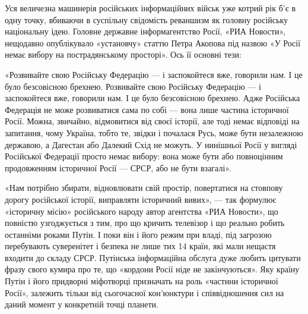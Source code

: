 Уся величезна машинерія російських інформаційних військ уже котрий рік б’є в
одну точку, вбиваючи в суспільну свідомість реваншизм як головну російську
національну ідею. Головне державне інформагентство Росії, «РИА Новости»,
нещодавно опублікувало «установчу» статтю Петра Акопова під назвою «У Росії
немає вибору на пострадянському просторі».  Ось її основні тези:

«Розвивайте свою Російську Федерацію --- і заспокойтеся вже, говорили нам.  І це
було безсовісною брехнею.  Розвивайте свою Російську Федерацію --- і заспокойтеся
вже, говорили нам.  І це було безсовісною брехнею.  Адже Російська Федерація не
може розвиватися сама по собі --- вона лише частина історичної Росії.  Можна,
звичайно, відмовитися від своєї історії, але тоді немає відповіді на запитання,
чому Україна, тобто те, звідки і почалася Русь, може бути незалежною державою,
а Дагестан або Далекий Схід не можуть. У нинішньої Росії у вигляді Російської
Федерації просто немає вибору: вона може бути або повноцінним продовженням
історичної Росії --- СРСР, або не бути взагалі».

«Нам потрібно збирати, відновлювати свій простір, повертатися на стовпову
дорогу російської історії, виправляти історичний вивих», --- так формулює
«історичну місію» російського народу автор агентства «РИА Новости», що повністю
узгоджується з тим, про що кричить телевізор і що реально робить останніми
роками Путін. І поки він і його режим при владі, під загрозою перебувають
суверенітет і безпека не лише тих 14 країн, які мали нещастя входити до складу
СРСР.  Путінська інформаційна обслуга дуже любить цитувати фразу свого кумира
про те, що «кордони Росії ніде не закінчуються». Яку країну Путін і його
придворні міфотворці призначать на роль «частини історичної Росії», залежить
тільки від сьогочасної кон’юнктури і співвідношення сил на даний момент у
конкретній точці планети.
